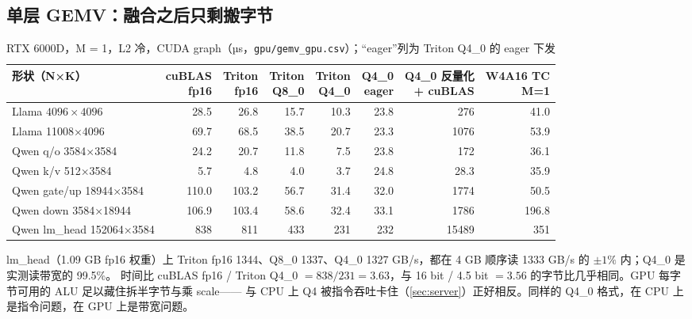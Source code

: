 \documentclass[11pt,a4paper]{ctexart}
\begin{document}
\subsection{单层 GEMV：融合之后只剩搬字节}

\begin{table}[H]
\centering\small
\caption{RTX 6000D，M = 1，L2 冷，CUDA graph（µs，\texttt{gpu/gemv\_gpu.csv}）；“eager”列为 Triton Q4\_0 的 eager 下发}\label{tab:gpu-gemv}
\begin{tabular}{lrrrrrrr}
\toprule
形状（N×K） & \makecell{cuBLAS\\fp16} & \makecell{Triton\\fp16} & \makecell{Triton\\Q8\_0} & \makecell{Triton\\Q4\_0} & \makecell{Q4\_0\\eager} & \makecell{Q4\_0 反量化\\+ cuBLAS} & \makecell{W4A16 TC\\M=1} \\
\midrule
Llama $4096\times4096$ & 28.5 & 26.8 & 15.7 & 10.3 & 23.8 & 276 & 41.0 \\
Llama 11008×4096 & 69.7 & 68.5 & 38.5 & 20.7 & 23.3 & 1076 & 53.9 \\
Qwen q/o 3584×3584 & 24.2 & 20.7 & 11.8 & 7.5 & 23.8 & 172 & 36.1 \\
Qwen k/v 512×3584 & 5.7 & 4.8 & 4.0 & 3.7 & 24.8 & 28.3 & 35.9 \\
Qwen gate/up 18944×3584 & 110.0 & 103.2 & 56.7 & 31.4 & 32.0 & 1774 & 50.5 \\
Qwen down 3584×18944 & 106.9 & 103.4 & 58.6 & 32.4 & 33.1 & 1786 & 196.8 \\
Qwen lm\_head 152064×3584 & 838 & 811 & 433 & 231 & 232 & 15489 & 351 \\
\bottomrule
\end{tabular}
\end{table}

\begin{findingbox}
lm\_head（1.09 GB fp16 权重）上 Triton fp16 1344、Q8\_0 1337、Q4\_0 1327 GB/s，都在 4 GB 顺序读 1333 GB/s 的 $\pm1\%$ 内；Q4\_0 是实测读带宽的 99.5\%。
时间比 cuBLAS fp16 / Triton Q4\_0 $= 838/231 = 3.63$，与 16 bit / 4.5 bit $= 3.56$ 的字节比几乎相同。GPU 每字节可用的 ALU 足以藏住拆半字节与乘 scale——
与 CPU 上 Q4 被指令吞吐卡住（\cref{sec:server}）正好相反。同样的 Q4\_0 格式，在 CPU 上是指令问题，在 GPU 上是带宽问题。
\end{findingbox}
\end{document}
